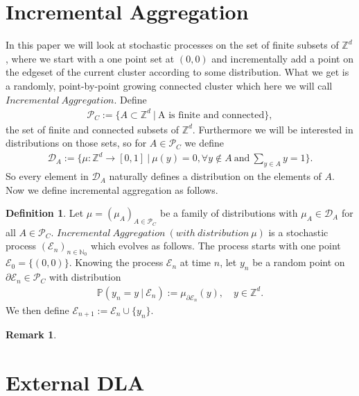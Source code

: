 \documentclass[12pt,a4paper]{scrartcl}
\numberwithin{equation}{section}
\numberwithin{equation}{section}%
\theoremstyle{definition}
\newtheorem{definition}[theorem]{Definition}
\theoremstyle{definition}
\newtheorem{rem}[thm]{Remark}%
\begin{document}
\newpage
\section{Incremental Aggregation}
In this paper we will look at stochastic processes on the set of finite subsets of $\mathbb{Z}^d$, where we start with a one point set at $(0,0)$ and incrementally add a point on the edgeset of the current cluster according to some distribution. What we get is a randomly, point-by-point growing connected cluster which here we will call $\mathit{Incremental\ Aggregation}$. Define 
\begin{align}
	\mathcal{P}_C := \{A\subset \mathbb{Z}^d\ |\ \text{A is finite and connected}\}, 
\end{align}
the set of finite and connected subsets of $\mathbb{Z}^d$. Furthermore we will be interested in distributions on those sets, so for $A\in \mathcal{P}_C$ we define 
\begin{align}
	\mathcal{D}_A:= \{\mu: \mathbb{Z}^d\to [0,1]\ |\ \mu(y) = 0, \forall y\notin A\ \text{and}\ \sum_{y\in A} y = 1 \}.
\end{align}
So every element in $\mathcal{D}_A$ naturally defines a distribution on the elements of $A$. Now we define incremental aggregation as follows.  

\begin{definition}
	Let $\mu=(\mu_A)_{A\in \mathcal{P}_C}$ be a family of distributions with $\mu_A\in \mathcal{D}_A$ for all $A\in \mathcal{P}_C$. $\mathit{Incremental\ Aggregation\ (with\ distribution\ \mu)}$ is a stochastic process $(\mathcal{E}_n)_{n\in{\mathbb{N}_0}}$ which evolves as follows. The process starts with one point $\mathcal{E}_0 = \{(0,0)\}$. Knowing the process $\mathcal{E}_n$ at time $n$, let $y_n$ be a random point on $\partial \mathcal{E}_n\in \mathcal{P}_C$ with distribution
	\begin{align}
		\mathbb{P}(y_n = y\ |\ \mathcal{E}_n) := \mu_{\partial \mathcal{E}_n}(y),\quad y\in \mathbb{Z}^d.
	\end{align}
	We then define $\mathcal{E}_{n+1} := \mathcal{E}_n \cup \{y_n\}$.
\end{definition} 

\begin{rem}
	
\end{rem}



\newpage

\newpage
\section{External DLA}
\end{document}
